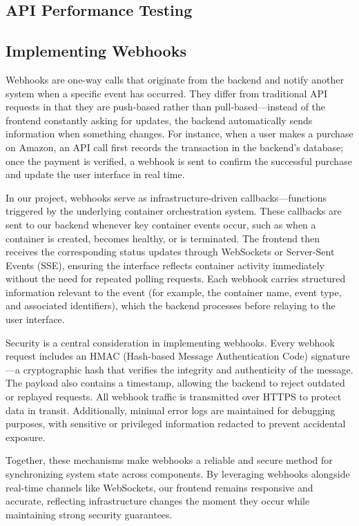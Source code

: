 \documentclass[12pt]{article}
\begin{document}
\subsection{API Performance Testing}

\subsection{Implementing Webhooks}
Webhooks are one-way calls that originate from the backend and notify another system when a specific event has occurred. They differ from traditional API requests in that they are push-based rather than pull-based—instead of the frontend constantly asking for updates, the backend automatically sends information when something changes. For instance, when a user makes a purchase on Amazon, an API call first records the transaction in the backend’s database; once the payment is verified, a webhook is sent to confirm the successful purchase and update the user interface in real time.

In our project, webhooks serve as infrastructure-driven callbacks—functions triggered by the underlying container orchestration system. These callbacks are sent to our backend whenever key container events occur, such as when a container is created, becomes healthy, or is terminated. The frontend then receives the corresponding status updates through WebSockets or Server-Sent Events (SSE), ensuring the interface reflects container activity immediately without the need for repeated polling requests. Each webhook carries structured information relevant to the event (for example, the container name, event type, and associated identifiers), which the backend processes before relaying to the user interface.

Security is a central consideration in implementing webhooks. Every webhook request includes an HMAC (Hash-based Message Authentication Code) signature—a cryptographic hash that verifies the integrity and authenticity of the message. The payload also contains a timestamp, allowing the backend to reject outdated or replayed requests. All webhook traffic is transmitted over HTTPS to protect data in transit. Additionally, minimal error logs are maintained for debugging purposes, with sensitive or privileged information redacted to prevent accidental exposure.

Together, these mechanisms make webhooks a reliable and secure method for synchronizing system state across components. By leveraging webhooks alongside real-time channels like WebSockets, our frontend remains responsive and accurate, reflecting infrastructure changes the moment they occur while maintaining strong security guarantees.
\end{document}
